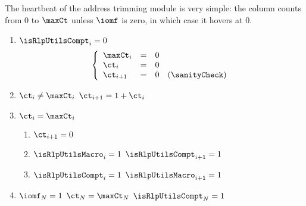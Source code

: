 The heartbeat of the address trimming module is very simple: the \ct{} column counts from $0$ to $\maxCt$ unless $\iomf$ is zero, in which case it hovers at $0$.
\begin{enumerate}
	\item $\isRlpUtilsCompt _{i} = 0$ \Then
		\[
			\left\{ \begin{array}{lclr}
				\maxCt _{i}      & = & 0 \\
				\ct    _{i}      & = & 0 \\
				\ct    _{i  + 1} & = & 0 & (\sanityCheck) \\
			\end{array} \right.
		\]
	\item \If $\ct _{i} \neq \maxCt _{i}$ \Then $\ct _{i + 1} = 1 + \ct _{i}$
	\item \If $\ct _{i} = \maxCt _{i}$ \Then 
		\begin{enumerate}
			\item $\ct _{i + 1} = 0$
			\item \If $\isRlpUtilsMacro _{i} =1$ \Then $\isRlpUtilsCompt _{i + 1} = 1$
			\item \If $\isRlpUtilsCompt _{i} =1$ \Then $\isRlpUtilsMacro _{i + 1} = 1$
		\end{enumerate}
	\item \If $\iomf _{N} = 1$ \Then $\ct _{N} = \maxCt _{N}$ \et $\isRlpUtilsCompt _{N} = 1$
\end{enumerate}
